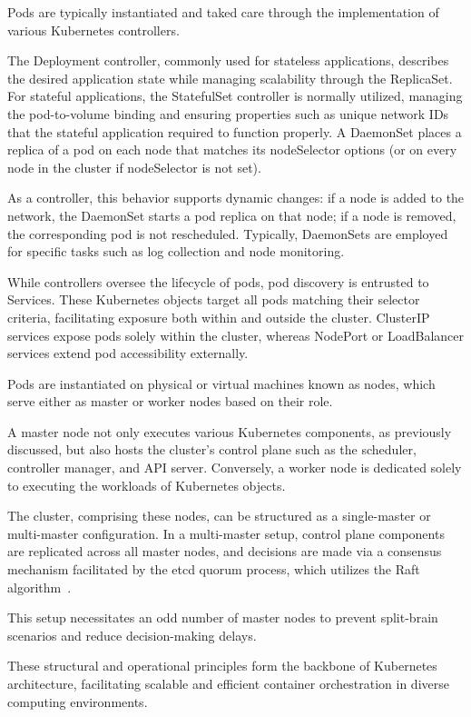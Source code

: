 Pods are typically instantiated and taked care through the implementation of various Kubernetes controllers.

The Deployment controller, commonly used for stateless applications, describes the desired application state while managing scalability through the ReplicaSet. For stateful applications, the StatefulSet controller is normally utilized, managing the pod-to-volume binding and ensuring properties such as unique network IDs that the stateful application required to function properly. A DaemonSet places a replica of a pod on each node that matches its nodeSelector options (or on every node in the cluster if nodeSelector is not set). 

As a controller, this behavior supports dynamic changes: if a node is added to the network, the DaemonSet starts a pod replica on that node; if a node is removed, the corresponding pod is not rescheduled. Typically, DaemonSets are employed for specific tasks such as log collection and node monitoring.

While controllers oversee the lifecycle of pods, pod discovery is entrusted to Services. These Kubernetes objects target all pods matching their selector criteria, facilitating exposure both within and outside the cluster. ClusterIP services expose pods solely within the cluster, whereas NodePort or LoadBalancer services extend pod accessibility externally.

Pods are instantiated on physical or virtual machines known as nodes, which serve either as master or worker nodes based on their role.

A master node not only executes various Kubernetes components, as previously discussed, but also hosts the cluster's control plane such as the scheduler, controller manager, and API server. Conversely, a worker node is dedicated solely to executing the workloads of Kubernetes objects.

The cluster, comprising these nodes, can be structured as a single-master or multi-master configuration. In a multi-master setup, control plane components are replicated across all master nodes, and decisions are made via a consensus mechanism facilitated by the etcd quorum process, which utilizes the Raft algorithm~\cite{k1-1}. 

This setup necessitates an odd number of master nodes to prevent split-brain~\cite{k1-2} scenarios and reduce decision-making delays. 

These structural and operational principles form the backbone of Kubernetes architecture, facilitating scalable and efficient container orchestration in diverse computing environments.

